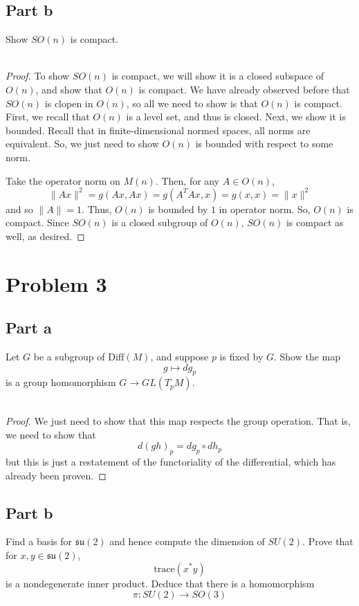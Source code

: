 \documentclass[fontsize=11pt]{scrartcl} %
\numberwithin{equation}{section} %
\numberwithin{figure}{section} %
\numberwithin{table}{section} %
\newcommand{\Diff}{\text{Diff}}
\begin{document}
\subsection*{Part b}
Show $SO(n)$ is compact.
\\
\\
\begin{proof}
    To show $SO(n)$ is compact, we will show it is a closed subspace of $O(n)$,
    and show that $O(n)$ is compact. We have already observed before that
    $SO(n)$ is clopen in $O(n)$, so all we need to show is that $O(n)$ is
    compact. First, we recall that $O(n)$ is a level set, and thus is closed.
    Next, we show it is bounded. Recall that in finite-dimensional normed
    spaces, all norms are equivalent. So, we just need to show $O(n)$ is bounded
    with respect to some norm.

    Take the operator norm on $M(n)$. Then, for any $A\in O(n)$,
    \[
        \|Ax\|^2 = g(Ax,Ax) = g(A^TAx,x) = g(x,x) =\|x\|^2
    \]
    and so $\|A\|=1$. Thus, $O(n)$ is bounded by $1$ in operator norm. So,
    $O(n)$ is compact. Since $SO(n)$ is a closed subgroup of $O(n)$, $SO(n)$ is
    compact as well, as desired.
\end{proof}

\section*{Problem 3}
\subsection*{Part a}
Let $G$ be a subgroup of $\Diff(M)$, and suppose $p$ is fixed by $G$.
Show the map
\[
    g\mapsto dg_p
\]
is a group homomorphism $G\to GL(T_pM)$.
\\
\\
\begin{proof}
    We just need to show that this map respects the group operation. That is, we
    need to show that
    \[
        d(gh)_p = dg_p\circ dh_p
    \]
    but this is just a restatement of the functoriality of the differential,
    which has already been proven.
\end{proof}

\subsection*{Part b}
Find a basis for $\mathfrak{su}(2)$ and hence compute the dimension of $SU(2)$.
Prove that for $x,y\in\mathfrak{su}(2)$,
\[
    \text{trace}(x^*y)
\]
is a nondegenerate inner product. Deduce that there is a homomorphism
\[
    \pi:SU(2)\to SO(3)
\]
\end{document}
